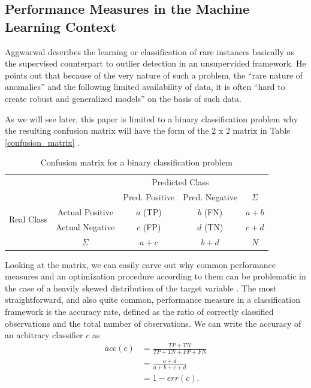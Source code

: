 \documentclass[12pt,a4paper]{article}
\begin{document}
\subsection{Performance Measures in the Machine Learning Context}
Aggwarwal \cite{aggarwalClassBook} describes the learning or classification of rare instances basically as the supervised counterpart to outlier detection in an unsupervided framework. He points out that because of the very nature of such a problem, the \enquote{rare nature of anomalies} and the following limited availability of data, it is often \enquote{hard to create robust and generalized models} on the basis of such data. \par
As we will see later, this paper is limited to a binary classification problem why the resulting confusion matrix will have the form of the 2 x 2 matrix in Table \vref{confusion_matrix} \cite{aggarwalClassBook}.\par
\begin{table}
\begin{center}
\begin{tabular}{c|c|c|c|c}
\multicolumn{2}{c}{}&\multicolumn{2}{c}{Predicted Class}&\\
\cline{3-4}
\multicolumn{2}{c|}{}&Pred. Positive&Pred. Negative&\multicolumn{1}{c}{$\Sigma$}\\
\cline{2-4}
\multirow{2}{*}{Real Class}& Actual Positive & $a$ (TP) & $b$ (FN) & $a+b$\\
\cline{2-4}
& Actual Negative & $c$ (FP) & $d$ (TN) & $c+d$\\
\cline{2-4}
\multicolumn{1}{c}{} & \multicolumn{1}{c}{$\Sigma$} & \multicolumn{1}{c}{$a+c$} & \multicolumn{    1}{c}{$b+d$} & \multicolumn{1}{c}{$N$}\\
\end{tabular}
\end{center}
\caption{Confusion matrix for a binary classification problem}
\label{confusion_matrix}
\end{table}
Looking at the matrix, we can easily carve out why common performance measures and an optimization procedure according to them can be problematic in the case of a heavily skewed distribution of the target variable \cite{chawla2002smote}. The most straightforward, and also quite common, performance measure in a classification framework is the accuracy rate, defined as the ratio of correctly classified observations and the total number of observations. We can write the accuracy of an arbitrary classifier $c$ as
\begin{align*}
    acc(c) &= \frac{TP + TN}{TP + TN + FP + FN}\\
    &= \frac{a +  d}{a + b + c + d}\\
    &=1-err(c).
\end{align*}
\end{document}
